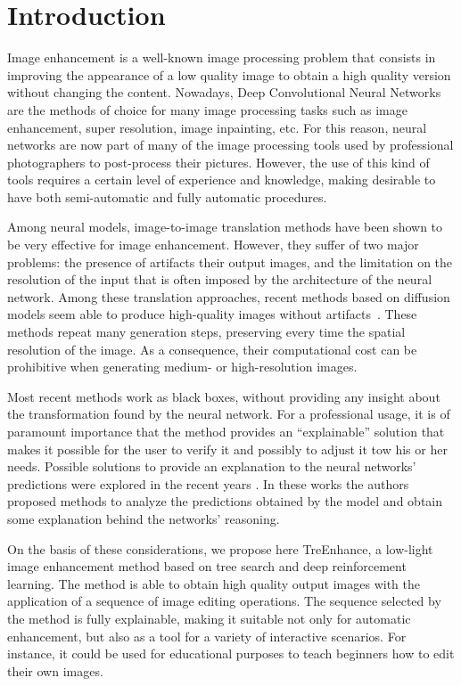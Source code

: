 \documentclass[3p,twocolumn]{elsarticle}
\newcommand{\method}[0]{TreEnhance}
\begin{document}
\section{Introduction}

Image enhancement is a well-known image processing problem that consists in improving the appearance of a low quality image to obtain a high quality version without changing the content. Nowadays, Deep Convolutional Neural Networks are the methods of choice for many image processing tasks such as image enhancement, super resolution, image inpainting, etc.  For this reason, neural networks are now part of many of the image processing tools used by professional photographers to post-process their pictures.  However, the use of this kind of tools requires a certain level of experience and knowledge, making desirable to have both semi-automatic and fully automatic procedures.

Among neural models, image-to-image translation methods
\cite{isola2017image,zhu2017unpaired,ignatov2017dslr} have been shown to be very effective for image enhancement.  However, they suffer of two major problems: the presence of artifacts their output images, and the limitation on the resolution of the input that is often imposed by the architecture of the neural network.
Among these translation approaches, recent methods based on diffusion models seem able to produce high-quality images without artifacts~\cite{saharia2022palette,kim2022diffusionclip,sasaki2021unit,batzolis2021conditional}. These methods repeat many generation steps, preserving every time the spatial resolution of the image. As a consequence, their computational cost can be prohibitive when generating medium- or high-resolution images.


Most recent methods work as black boxes, without providing any insight about the transformation found by the neural network.  For a professional usage, it is of paramount importance that the method provides an ``explainable'' solution that makes it possible for the user to verify it and possibly to adjust it tow his or her needs. Possible solutions to provide an explanation to the neural networks' predictions were explored in the recent years \cite{lundberg2017unified,selvaraju2017grad}. In these works the authors proposed methods to analyze the predictions obtained by the model and obtain some explanation behind the networks' reasoning.



On the basis of these considerations, we propose here \method{}, a low-light image enhancement method based on tree search and deep reinforcement learning.  The method is able to obtain high quality output images with the application of a sequence of image editing operations.
The sequence selected by the method is fully explainable, making it suitable not only for automatic enhancement, but also as a tool for a variety of interactive scenarios.  For instance, it could be used for educational purposes to teach beginners how to edit their own images.
\end{document}
